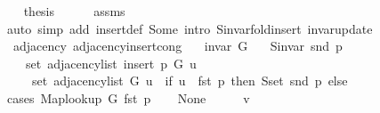 \begin{isabellebody}
\ \ \isamarkupfalse%
\ {\isacharquery}{\kern0pt}thesis\isanewline
\ \ \ \ \isamarkupfalse%
\ assms{\isacharparenleft}{\kern0pt}{}{\isacharparenright}{\kern0pt}\isanewline
\ \ \ \ \isamarkupfalse%
\ {\isacharparenleft}{\kern0pt}auto\ simp\ add{\isacharcolon}{\kern0pt}\ insert{\isacharunderscore}{\kern0pt}{}{\isacharunderscore}{\kern0pt}def\ Some\ intro{\isacharcolon}{\kern0pt}\ S{\isachardot}{\kern0pt}invar{\isacharunderscore}{\kern0pt}fold{\isacharunderscore}{\kern0pt}insert\ invar{\isacharunderscore}{\kern0pt}update{\isacharparenright}{\kern0pt}\isanewline
{}\isamarkupfalse%
%
\endisatagproof
{\isafoldproof}%
%
\isadelimproof
\isanewline
%
\endisadelimproof
\isanewline
{}\isamarkupfalse%
\ {\isacharparenleft}{\kern0pt}\ adjacency{\isacharparenright}{\kern0pt}\ adjacency{\isacharunderscore}{\kern0pt}insert{\isacharunderscore}{\kern0pt}{}{\isacharunderscore}{\kern0pt}cong{\isacharcolon}{\kern0pt}\isanewline
\ \ \ {\isachardoublequoteopen}invar\ G{\isachardoublequoteclose}\isanewline
\ \ \ {\isachardoublequoteopen}S{\isachardot}{\kern0pt}invar\ {\isacharparenleft}{\kern0pt}snd\ p{\isacharparenright}{\kern0pt}{\isachardoublequoteclose}\isanewline
\ \ \isanewline
\ \ \ \ {\isachardoublequoteopen}set\ {\isacharparenleft}{\kern0pt}adjacency{\isacharunderscore}{\kern0pt}list\ {\isacharparenleft}{\kern0pt}insert{\isacharunderscore}{\kern0pt}{}\ p\ G{\isacharparenright}{\kern0pt}\ u{\isacharparenright}{\kern0pt}\ {\isacharequal}{\kern0pt}\isanewline
\ \ \ \ \ set\ {\isacharparenleft}{\kern0pt}adjacency{\isacharunderscore}{\kern0pt}list\ G\ u{\isacharparenright}{\kern0pt}\ {\isasymunion}\ {\isacharparenleft}{\kern0pt}if\ u\ {\isacharequal}{\kern0pt}\ fst\ p\ then\ S{\isachardot}{\kern0pt}set\ {\isacharparenleft}{\kern0pt}snd\ p{\isacharparenright}{\kern0pt}\ else\ {\isacharbraceleft}{\kern0pt}{\isacharbraceright}{\kern0pt}{\isacharparenright}{\kern0pt}{\isachardoublequoteclose}\isanewline
%
\isadelimproof
%
\endisadelimproof
%
\isatagproof
{}\isamarkupfalse%
\ {\isacharparenleft}{\kern0pt}cases\ {\isachardoublequoteopen}Map{\isacharunderscore}{\kern0pt}lookup\ G\ {\isacharparenleft}{\kern0pt}fst\ p{\isacharparenright}{\kern0pt}{\isachardoublequoteclose}{\isacharparenright}{\kern0pt}\isanewline
\ \ \isamarkupfalse%
\ None\isanewline
\ \ \isacommand{{\isacharbraceleft}{\kern0pt}}\isamarkupfalse%
\ \isamarkupfalse%
\ v\isanewline

\end{isabellebody}
